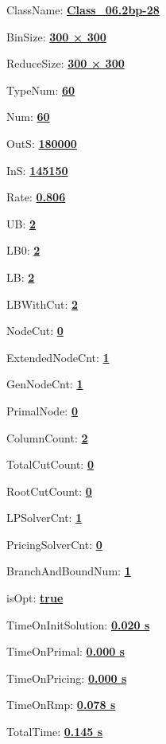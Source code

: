 \documentclass[11pt]{article}
\begin{document}
\pagestyle{empty}


ClassName: \underline{\textbf{Class_06.2bp-28}}
\par
BinSize: \underline{\textbf{300 × 300}}
\par
ReduceSize: \underline{\textbf{300 × 300}}
\par
TypeNum: \underline{\textbf{60}}
\par
Num: \underline{\textbf{60}}
\par
OutS: \underline{\textbf{180000}}
\par
InS: \underline{\textbf{145150}}
\par
Rate: \underline{\textbf{0.806}}
\par
UB: \underline{\textbf{2}}
\par
LB0: \underline{\textbf{2}}
\par
LB: \underline{\textbf{2}}
\par
LBWithCut: \underline{\textbf{2}}
\par
NodeCut: \underline{\textbf{0}}
\par
ExtendedNodeCnt: \underline{\textbf{1}}
\par
GenNodeCnt: \underline{\textbf{1}}
\par
PrimalNode: \underline{\textbf{0}}
\par
ColumnCount: \underline{\textbf{2}}
\par
TotalCutCount: \underline{\textbf{0}}
\par
RootCutCount: \underline{\textbf{0}}
\par
LPSolverCnt: \underline{\textbf{1}}
\par
PricingSolverCnt: \underline{\textbf{0}}
\par
BranchAndBoundNum: \underline{\textbf{1}}
\par
isOpt: \underline{\textbf{true}}
\par
TimeOnInitSolution: \underline{\textbf{0.020 s}}
\par
TimeOnPrimal: \underline{\textbf{0.000 s}}
\par
TimeOnPricing: \underline{\textbf{0.000 s}}
\par
TimeOnRmp: \underline{\textbf{0.078 s}}
\par
TotalTime: \underline{\textbf{0.145 s}}
\par
\newpage
\end{document}
